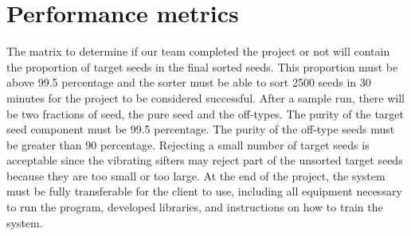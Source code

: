 \documentclass[letter,draftclsnoffot, onecolumn]{IEEEtran}
\begin{document}
\section{Performance metrics}
The matrix to determine if our team completed the project or not will contain the proportion of target seeds in the final sorted seeds. This proportion must be above 99.5 percentage and the sorter must be able to sort 2500 seeds in 30 minutes for the project to be considered successful. After a sample run, there will be two fractions of seed, the pure seed and the off-types. The purity of the target seed component must be 99.5 percentage. The purity of the off-type seeds must be greater than 90 percentage. Rejecting a small number of target seeds is acceptable since the vibrating sifters may reject part of the unsorted target seeds because they are too small or too large. At the end of the project, the system must be fully transferable for the client to use, including all equipment necessary to run the program, developed libraries, and instructions on how to train the system.

\end{document}
